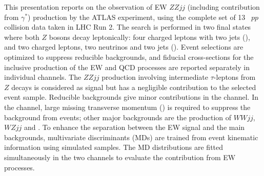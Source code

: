 This presentation reports on the observation of EW $ZZjj$ (including contribution from $\gamma^*$) production by the ATLAS experiment, using the complete set of 13 \TeV~$pp$ collision data taken in LHC Run 2. The search is performed in two final states where both $Z$ bosons decay leptonically: four charged leptons with two jets (\lllljj), and two charged leptons, two neutrinos and two jets (\llvvjj).
Event selections are optimized to suppress reducible backgrounds, and fiducial cross-sections for the inclusive production of the EW and QCD processes are reported separately in individual channels.
The $ZZjj$ production involving intermediate $\tau$-leptons from $Z$ decays is considered as signal but has a negligible contribution to the selected event sample. Reducible backgrounds give minor contributions in the \lllljj channel.
In the \llvvjj channel, large missing transverse momentum (\met) is required to suppress the background from \Zjet events; other major backgrounds are the production of $WWjj$, $WZjj$ and \ttbar.
To enhance the separation between the EW signal and the main backgrounds, multivariate discriminants (MDs) are trained from event kinematic information using simulated samples.
The MD distributions are fitted simultaneously in the two channels to evaluate the contribution from EW processes.


